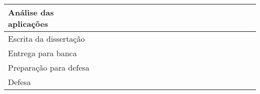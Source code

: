 \begin{table}[ht]
\begin{tabular}{|l|l|l|l|l|l|l|l|l|l|l|l|l|l|l|l|l|l|l|l|l|}
Análise das aplicações &  &                                                 &                          & \cellcolor[HTML]{C0C0C0} & \cellcolor[HTML]{C0C0C0} & \cellcolor[HTML]{C0C0C0} & \cellcolor[HTML]{C0C0C0} & \cellcolor[HTML]{C0C0C0} &                          &                          &                          &                          &                          &                          &                          &                          &                          &                          &                          &                          \\ \hline
Escrita da dissertação &  &                                                 &                          &                          &                          &                          &                          &                          & \cellcolor[HTML]{C0C0C0} & \cellcolor[HTML]{C0C0C0} & \cellcolor[HTML]{C0C0C0} & \cellcolor[HTML]{C0C0C0} & \cellcolor[HTML]{C0C0C0} &                          &                          &                          &                          &                          &                          &                          \\ \hline
Entrega para banca     &  &                                                 &                          &                          &                          &                          &                          &                          &                          &                          &                          &                          &                          & \cellcolor[HTML]{C0C0C0} &                          &                          &                          &                          &                          &                          \\ \hline
Preparação para defesa &  &                                                 &                          &                          &                          &                          &                          &                          &                          &                          &                          &                          &                          &                          & \cellcolor[HTML]{C0C0C0} & \cellcolor[HTML]{C0C0C0} & \cellcolor[HTML]{C0C0C0} &                          &                          &                          \\ \hline
Defesa                 &  &                                                 &                          &                          &                          &                          &                          &                          &                          &                          &                          &                          &                          &                          &                          &                          &                          & \cellcolor[HTML]{C0C0C0} &                          &                          \\ \hline

\end{tabular}
\end{table}
